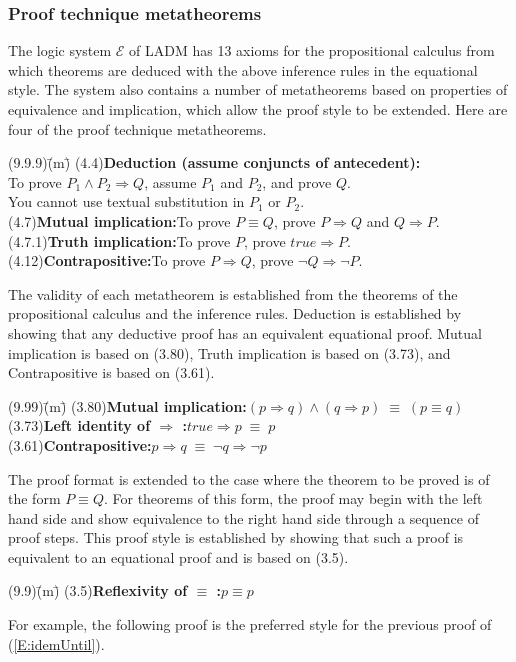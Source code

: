 \documentclass[12pt, fleqn, leqno]{article}
\newcommand{\lgap}{2pt}                             %
\newcommand{\equivs}{\ensuremath{\;\equiv\;}}       %
\newcommand{\impl}{\ensuremath{\Rightarrow}}        %
\begin{document}
\subsubsection{Proof technique metatheorems}

The logic system $\mathcal{E}$ of LADM \cite{LADM} has 13 axioms for the propositional calculus from which theorems are deduced
with the above inference rules in the equational style.
The system also contains a number of metatheorems based on properties of equivalence and implication, which allow the
proof style to be extended.
Here are four of the proof technique metatheorems.
\begin{tabbing}
(9.9.9)\;\=(m)\;\=\kill
(4.4)\>\textbf{Deduction (assume conjuncts of antecedent):}\\[\lgap]
      \>To prove $P_{1}\land P_{2}\impl Q$, assume $P_{1}$ and $P_{2}$, and prove $Q$.\\[\lgap]
      \>You cannot use textual substitution in $P_{1}$ or $P_{2}$.\\[\lgap]
(4.7)\>\textbf{Mutual implication:}\quad To prove $P\equiv Q$, prove $P\impl Q$ and $Q\impl P$.\\[\lgap]
(4.7.1)\>\textbf{Truth implication:}\quad To prove $P$, prove $\mathit{true}\impl P$.\\[\lgap]
(4.12)\>\textbf{Contrapositive:}\quad To prove $P\impl Q$, prove $\neg Q\impl \neg P$.
\end{tabbing}

The validity of each metatheorem is established from the theorems of the propositional calculus and the inference rules.
Deduction is established by showing that any deductive proof has an equivalent equational proof.
Mutual implication is based on (3.80), Truth implication is based on (3.73), and Contrapositive is based on (3.61).
\begin{tabbing}
(9.99)\;\=(m)\;\=\kill
(3.80)\>\textbf{Mutual implication:}\quad $(p\impl q) \land (q\impl p) \equivs (p\equiv q)$\\[\lgap]
(3.73)\>\textbf{Left identity of $\impl$ :}\quad $true\impl p \equivs p$\\[\lgap]
(3.61)\>\textbf{Contrapositive:}\quad $p\impl q \equivs \neg q\impl \neg p$
\end{tabbing}

The proof format is extended to the case where the theorem to be proved is of the form $P \equiv Q$.
For theorems of this form, the proof may begin with the left hand side and show equivalence to the right hand side through a sequence of proof steps.
This proof style is established by showing that such a proof is equivalent to an equational proof and is based on (3.5).
\begin{tabbing}
(9.9)\;\=(m)\;\=\kill
(3.5)\>\textbf{Reflexivity of $\equiv$ :}\quad $p\equiv p$
\end{tabbing}
For example, the following proof is the preferred style for the previous proof of (\ref{E:idemUntil}).
\end{document}
